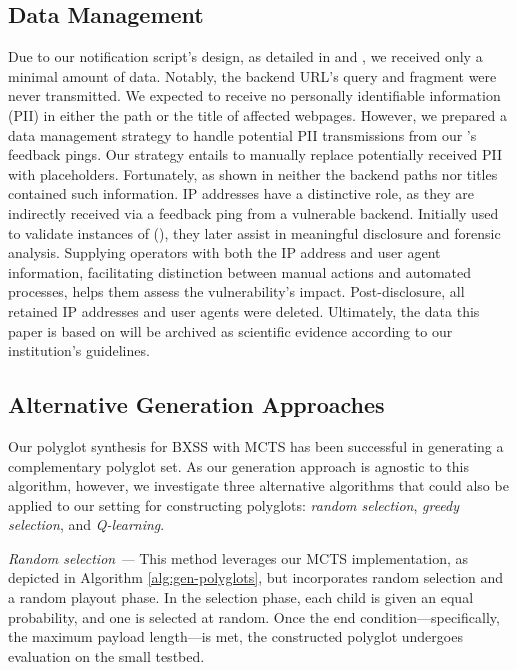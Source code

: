 \subsection{Data Management}
\label{appendix:data-management}
Due to our notification script's design, as detailed in  and , we received only a minimal amount of data.
Notably, the backend URL's query and fragment were never transmitted.
We expected to receive no personally identifiable information (PII) in either the path or the title of affected webpages.
However, we prepared a data management strategy to handle potential PII transmissions from our \ourscriptname{}'s feedback pings.
Our strategy entails to manually replace potentially received PII with placeholders.
Fortunately, as shown in  neither the backend paths nor titles contained such information.
IP addresses have a distinctive role, as they are indirectly received via a feedback ping from a vulnerable backend.
Initially used to validate instances of \blindxss{} (), they later assist in meaningful disclosure and forensic analysis.
Supplying operators with both the IP address and user agent information, facilitating distinction between manual actions and automated processes, helps them assess the vulnerability's impact.
Post-disclosure, all retained IP addresses and user agents were deleted.
Ultimately, the data this paper is based on will be archived as scientific evidence according to our institution's guidelines.%











\subsection{Alternative Generation Approaches}%
\label{appendix:alternative-generation}

Our polyglot synthesis for BXSS with MCTS has been successful in generating a complementary polyglot set. As our generation approach is agnostic to this algorithm, however, we investigate three alternative algorithms that could also be applied to our setting for constructing polyglots: \emph{random selection}, \emph{greedy selection}, and \emph{Q-learning}. %

\smallskip
\emph{Random selection ---} This method leverages our MCTS implementation, as depicted in Algorithm \ref{alg:gen-polyglots}, but incorporates random selection and a random playout phase. In the selection phase, each child is given an equal probability, and one is selected at random. Once the end condition---specifically, the maximum payload length---is met, the constructed polyglot undergoes evaluation on the small testbed.

